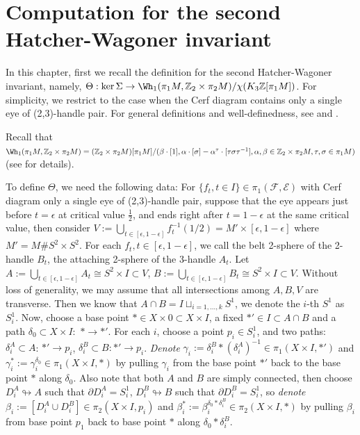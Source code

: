 \chapter{Computation for the second Hatcher-Wagoner invariant}
\label{chap:computation-for-the-second-hatcher-wagoner-invariant}

In this chapter, first we recall the definition for the second Hatcher-Wagoner invariant, namely, $\Theta: \ker\Sigma\to \Wh_1(\pi_1M, \mathbb{Z}_2\times \pi_2M)/\chi(K_3\mathbb{Z}[\pi_1 M])$. For simplicity, we restrict to the case when the Cerf diagram contains only a single eye of (2,3)-handle pair. For general definitions and well-definedness, see \cite{AST_1973__6__1_0} and \cite{singh2022pseudoisotopiesdiffeomorphisms4manifolds}.

Recall that $\Wh_1(\pi_1M, \mathbb{Z}_2\times \pi_2 M)=(\mathbb{Z}_2\times \pi_2 M)[\pi_1 M]/(\beta\cdot [1], \alpha\cdot [\sigma]-\alpha^\tau\cdot [\tau\sigma\tau^{-1}], \alpha,\beta\in \mathbb{Z}_2\times \pi_2 M, \tau,\sigma\in \pi_1 M)$ (see \cite{singh2022pseudoisotopiesdiffeomorphisms4manifolds} for details). 

To define $\Theta$, we need the following data: For $\{f_t,t\in I\}\in \pi_1(\mathcal{F},\mathcal{E})$ with Cerf diagram only a single eye of (2,3)-handle pair, suppose that the eye appears just before $t=\epsilon$ at critical value $\frac{1}{2}$, and ends right after $t=1-\epsilon$ at the same critical value, then consider $V:=\bigcup_{t\in [\epsilon, 1-\epsilon]} f_t^{-1}(1/2)=M'\times[\epsilon, 1-\epsilon]$ where $M'=M\# S^2\times S^2$. For each $f_t, t\in [\epsilon,1-\epsilon]$, we call the belt 2-sphere of the 2-handle $B_t$, the attaching 2-sphere of the 3-handle $A_t$. Let $A:=\bigcup_{t\in[\epsilon, 1-\epsilon]} A_t\cong S^2\times I\subset V$, $B:=\bigcup_{t\in[\epsilon, 1-\epsilon]} B_t\cong S^2\times I\subset V$. Without loss of generality, we may assume that all intersections among $A,B, V$ are transverse. Then we know that $A\cap B=I\sqcup_{i=1,...,k} S^1$, we denote the $i$-th $S^1$ as $S_i^1$. Now, choose a base point $*\in X\times 0\subset X\times I$, a fixed $*'\in I\subset A\cap B$ and a path $\delta_0\subset X\times I:$ $*\to *'$. For each $i$, choose a point $p_i\in S_i^1$, and two paths: $\delta^A_i\subset A$: $*'\to p_i$,
$\delta^B_i\subset B: *'\to p_i$. \emph{Denote} $\gamma_i:=\delta^B_i*(\delta^A_i)^{-1}\in \pi_1(X\times I, *')$ and $\gamma_i^*:=\gamma_i^{\delta_0}\in \pi_1(X\times I,*)$ by pulling $\gamma_i$ from the base point $*'$ back to the base point $*$ along $\delta_0$. Also note that both $A$ and $B$ are simply connected, then choose $D_i^A\looparrowright A$ such that $\partial D^A_i=S^1_i$, $D_i^B\looparrowright B$ such that $\partial D^B_i=S_i^1$, so \emph{denote} $\beta_i:=[D^A_i\cup D^B_i]\in \pi_2(X\times I, p_i)$  and $\beta_i^*:=\beta_i^{\delta_0*\delta_i^B}\in \pi_2(X\times I,*)$ by pulling $\beta_i$ from base point $p_1$ back to base point $*$ along $\delta_0*\delta_i^B$. 

